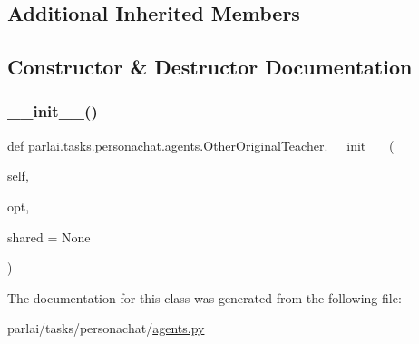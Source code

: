 \subsection*{Additional Inherited Members}


\subsection{Constructor \& Destructor Documentation}
\mbox{\label{classparlai_1_1tasks_1_1personachat_1_1agents_1_1OtherOriginalTeacher_abd6f89edfdb5f7594fc3e63cc1c940b8}} 
\subsubsection{\texorpdfstring{\+\_\+\+\_\+init\+\_\+\+\_\+()}{\_\_init\_\_()}}
{\footnotesize\ttfamily def parlai.\+tasks.\+personachat.\+agents.\+Other\+Original\+Teacher.\+\_\+\+\_\+init\+\_\+\+\_\+ (\begin{DoxyParamCaption}\item[{}]{self,  }\item[{}]{opt,  }\item[{}]{shared = {\ttfamily None} }\end{DoxyParamCaption})}



The documentation for this class was generated from the following file\+:\begin{DoxyCompactItemize}
\item 
parlai/tasks/personachat/\hyperlink{parlai_2tasks_2personachat_2agents_8py}{agents.\+py}\end{DoxyCompactItemize}
